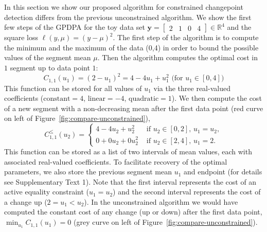 \documentclass[twoside,11pt]{article}
\newcommand{\RR}{\mathbb R}
\begin{document}
In this section we show our proposed algorithm for constrained
changepoint detection differs from the previous unconstrained
algorithm. We show the first few steps of the GPDPA for the toy data
set $\mathbf y= \left[
\begin{array}{cccccc}
  2 & 1 & 0 & 4
\end{array}
\right] \in\RR^4$ and the square loss $\ell(y,\mu)=(y-\mu)^2$. The first
step of the algorithm is to compute the minimum and the maximum of the
data (0,4) in order to bound the possible values of the segment
mean $\mu$. Then the algorithm computes the optimal cost in $1$ segment up
to data point $1$:
\begin{equation}
  C_{1,1}(u_1) = (2-u_1)^2=4 - 4u_1 + u_1^2\text{ (for $u_1\in[0,4]$)}
\end{equation}
This function can be stored for all values of $u_1$ via the three
real-valued coefficients ($\text{constant}=4$, $\text{linear}=-4$,
$\text{quadratic}=1$). We then compute the cost of a new segment with
a non-decreasing mean after the first data point (red curve on left of
Figure~\ref{fig:compare-unconstrained}),
\begin{equation}
  C_{1,1}^\leq(u_2) =
  \begin{cases}
    4 - 4 u_2 + u_2^2 &\text{ if }u_2\in[0,2],\, u_1=u_2,\\
    0 + 0 u_2 + 0 u_2^2 & \text{ if }u_2\in[2,4],\,  u_1=2.
  \end{cases}
\end{equation}
This function can be stored as a list of two intervals of mean
values, each with associated real-valued coefficients. To facilitate
recovery of the optimal parameters, we also store the previous segment
mean $u_1$ and endpoint (for details see Supplementary
Text 1). Note that the first interval represents the cost of an
active equality constraint ($u_1=u_2$) and the second interval
represents the cost of a change up ($2=u_1<u_2$). In the unconstrained
algorithm we would have computed the constant cost of any change (up
or down) after the first data point, $\min_{u_1} C_{1,1}(u_1) =0$
(grey curve on left of Figure~\ref{fig:compare-unconstrained}).
\end{document}

